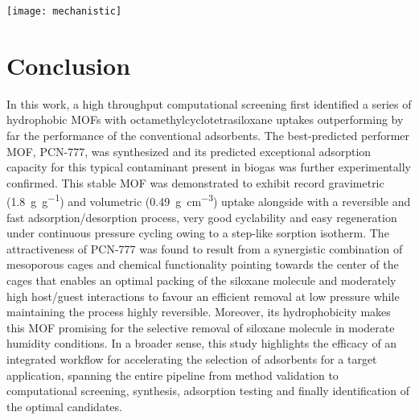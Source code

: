 \begin{widefigure}[tb]
    \centering
    \texttt{[image: mechanistic]}
    \caption{%
        Representative snapshots of the preferential sitting of D4 for increasing
        loading at (a) 10\% with highlighted interactions distance between D4 and the
        MOF framework, and at (b) 40\%, (c) 65\%, and (d) 100\% fractional loading
        (\(\theta\)) in the pores of PCN-777 at \SI{298}{\kelvin}. Framework atoms
        (sticks) and D4 molecules (lines, and ball and sticks) are coded as Zr, N, O,
        Si, C, and H atoms in light blue, dark blue, red, yellow, dark grey, and light
        grey respectively. The atomic distance is represented by dashed black lines and
        reported in Å.
    }\label{fig:d4-mechanistic}
\end{widefigure}

\section{Conclusion}\label{conclusion}

In this work, a high throughput computational screening first identified a
series of hydrophobic MOFs with octamethylcyclotetrasiloxane uptakes
outperforming by far the performance of the conventional adsorbents. The
best-predicted performer MOF, PCN-777, was synthesized and its predicted
exceptional adsorption capacity for this typical contaminant present in biogas
was further experimentally confirmed. This stable MOF was demonstrated to
exhibit record gravimetric (\SI{1.8}{\gram\per\gram}) and volumetric
(\SI{0.49}{\gram\per\centi\metre\cubed}) uptake alongside with a reversible and fast
adsorption/desorption process, very good cyclability and easy regeneration under
continuous pressure cycling owing to a step-like sorption isotherm. The
attractiveness of PCN-777 was found to result from a synergistic combination of
mesoporous cages and chemical functionality pointing towards the center of the
cages that enables an optimal packing of the siloxane molecule and moderately
high host/guest interactions to favour an efficient removal at low pressure
while maintaining the process highly reversible. Moreover, its hydrophobicity
makes this MOF promising for the selective removal of siloxane molecule in
moderate humidity conditions. In a broader sense, this study highlights the
efficacy of an integrated workflow for accelerating the selection of adsorbents
for a target application, spanning the entire pipeline from method validation to
computational screening, synthesis, adsorption testing and finally
identification of the optimal candidates.

